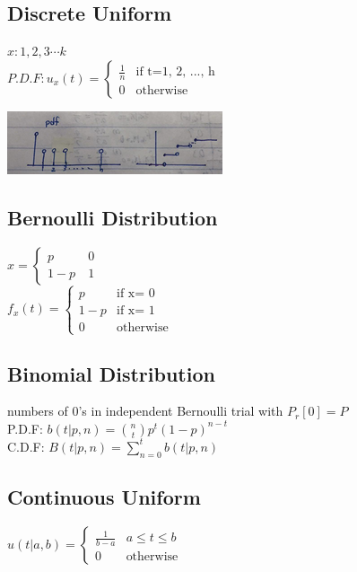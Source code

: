 \documentclass{article}
\begin{document}
	               
\subsection{Discrete Uniform}            
	$ x: 1,2,3 \cdots k$
	\\$ P.D.F: u_x(t)= \begin{cases} \frac{1}{n}  & \text{if t=1, 2, ..., h} \\ 	
	0& \text{otherwise} \end{cases}$

\begin{center}{
\includegraphics{discreteuniform.png}
}
\end{center}	
           
\subsection{Bernoulli Distribution}             	
	$x= \begin{cases} p  &\ 0 \\ 
	1-p &\ 1 \end{cases}$
	\\$f_x(t)= \begin{cases} p  &\text{if x= 0} \\ 
	1-p &\text{if x= 1} \\
	0 &\text{otherwise}\end{cases}$

\subsection{Binomial Distribution} 
	numbers of 0's in independent Bernoulli trial with $P_r[0]= P$
	\\P.D.F: $b(t| p, n)= {n \choose t}p^t (1-p)^{n-t}$
	\\C.D.F: $B(t| p, n)= \sum_{n=0}^t b(t| p, n)$
	
\subsection{Continuous Uniform} 		
	$ u(t| a, b)= \begin{cases} \frac{1}{b-a}  & a \le t \le b \\ 
	0& \text{otherwise} \end{cases}$
	
\end{document}
